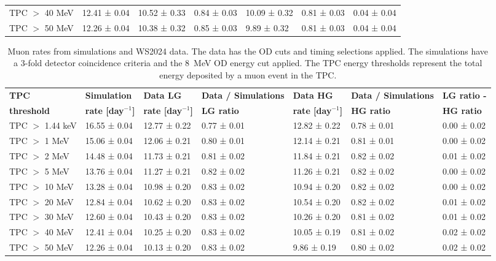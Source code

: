 \begin{landscape}
\begin{table}[ht!]
\begin{tabular}{lllllll}
    TPC $>$ 40 MeV &  12.41 ± 0.04 &  10.52 ± 0.33 & 0.84 ± 0.03  &  10.09 ± 0.32 & 0.81 ± 0.03  & 0.04 ± 0.04 \\
    TPC $>$ 50 MeV &  12.26 ± 0.04 &  10.38 ± 0.32 & 0.85 ± 0.03  &   9.89 ± 0.32 & 0.81 ± 0.03  & 0.04 ± 0.04 \\
    \hline\hline
    \end{tabular}
    \label{tab:Muons/Rates2022}
\end{table}
\begin{table}[ht!]
    \centering
    \caption[Muon rates from simulations and WS2024 data.]{Muon rates from simulations and WS2024 data. The data has the OD cuts and timing selections applied. The simulations have a 3-fold detector coincidence criteria and the 8~MeV OD energy cut applied. The TPC energy thresholds represent the total energy deposited by a muon event in the TPC.}
    \begin{tabular}{lllllll}
    \hline\hline
    \textbf{TPC} & \textbf{Simulation} & \textbf{Data LG} & \textbf{Data / Simulations} & \textbf{Data HG} & \textbf{Data / Simulations} & \textbf{LG ratio -} \\
    \textbf{threshold} & \textbf{rate [day$^{-1}$]} & \textbf{rate [day$^{-1}$]} & \textbf{LG ratio} & \textbf{rate [day$^{-1}$]} & \textbf{HG ratio} & \textbf{HG ratio} \\
    \hline
    TPC $>$ 1.44 keV & 16.55 ± 0.04 & 12.77 ± 0.22 & 0.77 ± 0.01  & 12.82 ± 0.22 & 0.78 ± 0.01  &0.00 ± 0.02 \\ 
    TPC $>$ 1 MeV & 15.06 ± 0.04 & 12.06 ± 0.21 & 0.80 ± 0.01  & 12.14 ± 0.21 & 0.81 ± 0.01  &0.00 ± 0.02 \\ 
    TPC $>$ 2 MeV & 14.48 ± 0.04 & 11.73 ± 0.21 & 0.81 ± 0.02  & 11.84 ± 0.21 & 0.82 ± 0.02  &0.01 ± 0.02 \\ 
    TPC $>$ 5 MeV & 13.76 ± 0.04 & 11.27 ± 0.21 & 0.82 ± 0.02  & 11.26 ± 0.21 & 0.82 ± 0.02  &0.00 ± 0.02 \\ 
    TPC $>$ 10 MeV & 13.28 ± 0.04 & 10.98 ± 0.20 & 0.83 ± 0.02  & 10.94 ± 0.20 & 0.82 ± 0.02  &0.00 ± 0.02 \\ 
    TPC $>$ 20 MeV & 12.84 ± 0.04 & 10.62 ± 0.20 & 0.83 ± 0.02  & 10.54 ± 0.20 & 0.82 ± 0.02  &0.01 ± 0.02 \\ 
    TPC $>$ 30 MeV & 12.60 ± 0.04 & 10.43 ± 0.20 & 0.83 ± 0.02  & 10.26 ± 0.20 & 0.81 ± 0.02  &0.01 ± 0.02 \\ 
    TPC $>$ 40 MeV & 12.41 ± 0.04 & 10.25 ± 0.20 & 0.83 ± 0.02  & 10.05 ± 0.19 & 0.81 ± 0.02  &0.02 ± 0.02 \\ 
    TPC $>$ 50 MeV & 12.26 ± 0.04 & 10.13 ± 0.20 & 0.83 ± 0.02  &  9.86 ± 0.19 & 0.80 ± 0.02  &0.02 ± 0.02 \\
    \hline\hline
    \end{tabular}
    \label{tab:Muons/Rates2024}
\end{table}
\end{landscape}